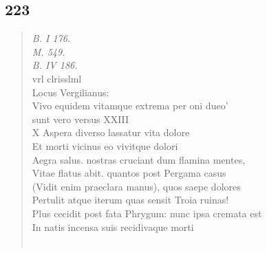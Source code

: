 \documentclass[11pt, a4paper]{report}
\begin{document}
            \subsection*{223}
      \begin{verse}
      \textit{B. I 176.} \\ \textit{M. 549.} \\ \textit{B. IV 186.} \\ vrl clrisslml \\ Locus Vergilianus: \\ Vivo equidem vitamque extrema per oni dueo’ \\  \lbrack sunt vero \rbrack  versus XXIII \\ X Aspera diverso lassatur vita dolore \\ Et morti vicinus eo vivitque dolori \\ Aegra salus. nostras cruciant dum flamina mentes, \\ Vitae flatus abit. quantos post Pergama casus \\ (Vidit enim praeclara manus), quos saepe dolores \\ Pertulit atque iterum quas sensit Troia ruinas! \\ Plus cecidit post fata Phrygum: nunc ipsa cremata est \\ In natis incensa suis recidivaque morti \\ 
        ﻿\pagebreak 

\end{verse}
\end{document}
